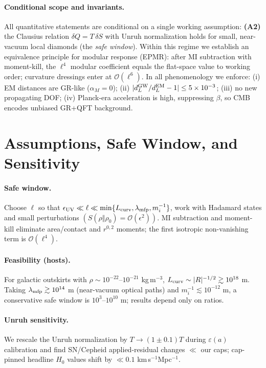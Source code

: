 \documentclass[aps,prd,onecolumn,notitlepage,superscriptaddress,nofootinbib]{revtex4-2}
\newcommand{\alpham}{\alpha_M}
\newcommand{\Hzero}{H_0}
\newcommand{\eps}{\varepsilon}
\begin{document}
\paragraph*{Conditional scope and invariants.}
All quantitative statements are conditional on a single working assumption:
\textbf{(A2)} the Clausius relation \(\delta Q = T\,\delta S\) with Unruh normalization holds for small, near-vacuum local diamonds (the \emph{safe window}). Within this regime we establish an equivalence principle for modular response (EPMR): after MI subtraction with moment-kill, the \(\ell^4\) modular coefficient equals the flat-space value to working order; curvature dressings enter at \(\mathcal{O}(\ell^6)\). In all phenomenology we enforce: (i) EM distances are GR-like (\(\alpham=0\)); (ii) \(|d_L^{\rm GW}/d_L^{\rm EM}-1|\le 5\times 10^{-3}\); (iii) no new propagating DOF; (iv) Planck-era acceleration is high, suppressing \(\beta\), so CMB encodes unbiased GR+QFT background.

\section{Assumptions, Safe Window, and Sensitivity}
\paragraph*{Safe window.}
Choose \(\ell\) so that \(\epsilon_{\rm UV}\ll \ell \ll \min\{L_{\rm curv},\lambda_{\rm mfp},m_i^{-1}\}\), work with Hadamard states and small perturbations \((S(\rho\Vert\rho_0)=\mathcal{O}(\epsilon^2))\). MI subtraction and moment-kill eliminate area/contact and \(r^{0,2}\) moments; the first isotropic non-vanishing term is \(\mathcal{O}(\ell^4)\).

\paragraph*{Feasibility (hosts).}
For galactic outskirts with \(\rho \sim 10^{-22}\)--\(10^{-21}\) kg\,m\(^{-3}\), \(L_{\rm curv}\sim |R|^{-1/2}\gtrsim 10^{18}\) m. Taking \(\lambda_{\rm mfp}\gtrsim 10^{14}\) m (near-vacuum optical paths) and \(m_i^{-1}\lesssim 10^{-12}\) m, a conservative safe window is \(10^3\)--\(10^{10}\) m; results depend only on ratios.

\paragraph*{Unruh sensitivity.}
We rescale the Unruh normalization by \(T\to (1\pm 0.1)T\) during \(\eps(a)\) calibration and find SN/Cepheid applied-residual changes \(\ll\) our caps; cap-pinned headline \(\Hzero\) values shift by \(\ll 0.1\) km\,s\(^{-1}\)Mpc\(^{-1}\).
\end{document}
